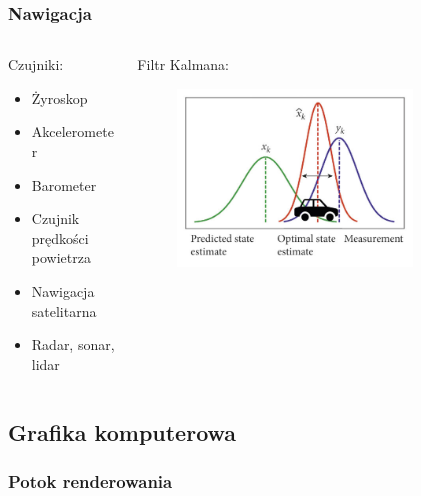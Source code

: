 \documentclass[aspectratio=169]{beamer}
\begin{document}
\begin{frame}%
	\frametitle{Nawigacja}
	\begin{columns}[T]
		\begin{column}{0.5\textwidth}
	   	 	 Czujniki:
	   	 	 \begin{itemize}
			  \item{
			    Żyroskop
			    \pause
			  }
			  \item {   
			    Akcelerometer
			    \pause
			  }
			  \item {   
			    Barometer
			    \pause
			  }
			  \item {   
			    Czujnik prędkości powietrza
			    \pause
			  }
			  \item {   
			    Nawigacja satelitarna
			    \pause
			  }
			  \item {   
			    Radar, sonar, lidar
			  }
	     \end{itemize}
	     \pause
	   	 	
		\end{column}
		\begin{column}{0.5\textwidth}
			Filtr Kalmana:
	   	 	\begin{figure}
	   		 \centering
	      		 \includegraphics[width=0.8\textwidth]{kalman.png}
	    		\end{figure}
		\end{column}
	\end{columns}
\end{frame}

\subsection{Grafika komputerowa}

\begin{frame}[allowframebreaks]
	\frametitle{Potok renderowania}
	
\end{frame}
\end{document}
